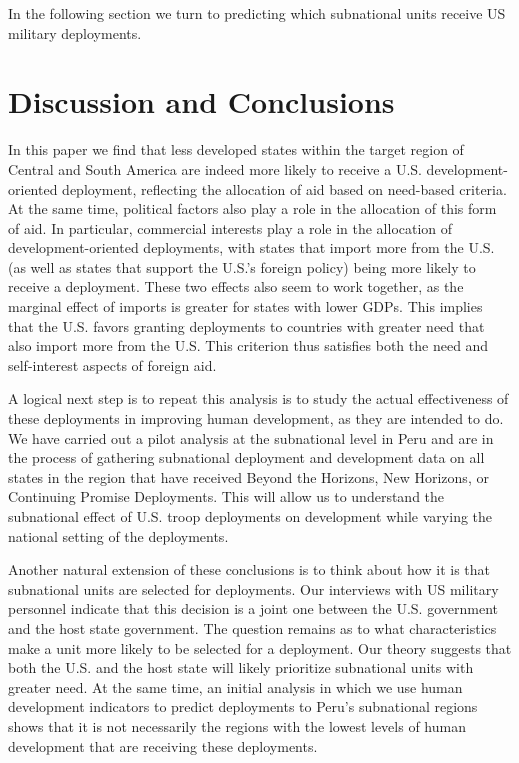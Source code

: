 \documentclass[12pt]{article}
\begin{document}
\begin{doublespace}
In the following section we turn to predicting which subnational units receive US military deployments.






\section{Discussion and Conclusions}


In this paper we find that less developed states within the target region of Central and South America are indeed more likely to receive a U.S. development-oriented deployment, reflecting the allocation of aid based on need-based criteria.  At the same time, political factors also play a role in the allocation of this form of aid. In particular, commercial interests play a role in the allocation of development-oriented deployments, with states that import more from the U.S. (as well as states that support the U.S.'s foreign policy) being more likely to receive a deployment.  These two effects also seem to work together, as the marginal effect of imports is greater for states with lower GDPs.  This implies that the U.S. favors granting deployments to countries with greater need that also import more from the U.S.  This criterion thus satisfies both the need and self-interest aspects of foreign aid. 

A logical next step is to repeat this analysis is to study the actual effectiveness of these deployments in improving human development, as they are intended to do.  We have carried out a pilot analysis at the subnational level in Peru and are in the process of gathering subnational deployment and development data on all states in the region that have received Beyond the Horizons, New Horizons, or Continuing Promise Deployments.  This will allow us to understand the subnational effect of U.S. troop deployments on development while varying the national setting of the deployments.  

Another natural extension of these conclusions is to think about how it is that subnational units are selected for deployments.  Our interviews with US military personnel indicate that this decision is a joint one between the U.S. government and the host state government.  The question remains as to what characteristics make a unit more likely to be selected for a deployment.  Our theory suggests that both the U.S. and the host state will likely prioritize subnational units with greater need.  At the same time, an initial analysis in which we use human development indicators to predict deployments to Peru's subnational regions shows that it is not necessarily the regions with the lowest levels of human development that are receiving these deployments.  


\end{doublespace}
\end{document}
